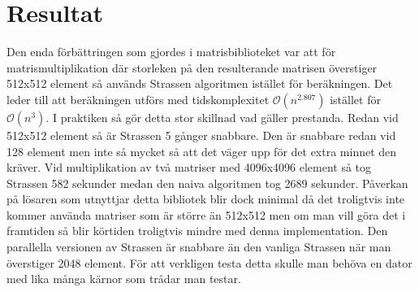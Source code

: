 \section{Resultat}
Den enda förbättringen som gjordes i matrisbiblioteket var att för matrismultiplikation där storleken på den resulterande matrisen överstiger 512x512 element så används Strassen algoritmen istället för beräkningen. Det leder till att beräkningen utförs med tidskomplexitet $\mathcal{O}(n^{2.807})$ istället för $\mathcal{O}(n^{3})$. I praktiken så gör detta stor skillnad vad gäller prestanda. Redan vid 512x512 element så är Strassen 5 gånger snabbare. Den är snabbare redan vid 128 element men inte så mycket så att det väger upp för det extra minnet den kräver. Vid multiplikation av två matriser med 4096x4096 element så tog Strassen 582 sekunder medan den naiva algoritmen tog 2689 sekunder. Påverkan på lösaren som utnyttjar detta bibliotek blir dock minimal då det troligtvis inte kommer använda matriser som är större än 512x512 men om man vill göra det i framtiden så blir körtiden troligtvis mindre med denna implementation.
\newline
\newline
Den parallella versionen av Strassen är snabbare än den vanliga Strassen när man överstiger 2048 element. För att verkligen testa detta skulle man behöva en dator med lika många kärnor som trådar man testar. 